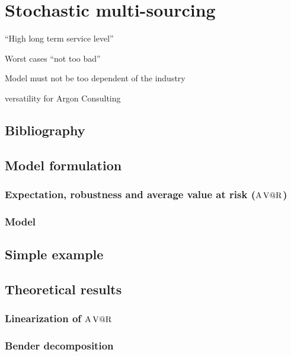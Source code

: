 \chapter{Stochastic multi-sourcing}


       ``High long term service level''


       Worst cases ``not too bad''

     Model must not be too dependent of the industry

       versatility for Argon Consulting

\section{Bibliography}


\section{Model formulation}

\subsection{Expectation, robustness and average value at risk ($\operatorname{A\operatorname{V@R}}$)}


\subsection{Model}


\section{Simple example}


\section{Theoretical results}

\subsection{Linearization of $\operatorname{A\operatorname{V@R}}$}

\subsection{Bender decomposition}



